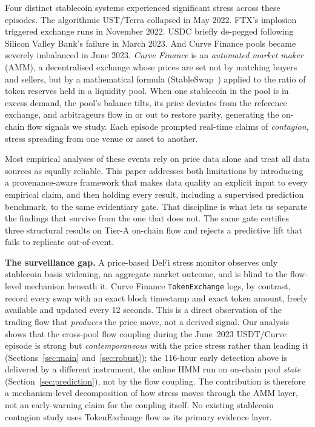 \documentclass[sigconf,anonymous]{acmart}
\begin{document}
Four distinct stablecoin systems experienced significant stress across these
episodes. The algorithmic UST/Terra collapsed in May 2022. FTX's implosion
triggered exchange runs in November 2022. USDC briefly de-pegged following
Silicon Valley Bank's failure in March 2023. And Curve Finance pools became
severely imbalanced in June 2023.  \emph{Curve Finance} is an \emph{automated
market maker} (AMM), a decentralised exchange whose prices are set not by
matching buyers and sellers, but by a mathematical formula (StableSwap~\cite{Egorov2019})
applied to the ratio of token reserves held in a liquidity pool.  When one
stablecoin in the pool is in excess demand, the pool's balance tilts, its
price deviates from the reference exchange, and arbitrageurs flow in or out
to restore parity, generating the on-chain flow signals we study.
Each episode prompted real-time claims of
\emph{contagion}, stress spreading from one venue or asset to another.

Most empirical analyses of these events rely on price data alone and treat all
data sources as equally reliable.  This paper addresses both limitations by
introducing a provenance-aware framework that makes data quality an explicit
input to every empirical claim, and then holding every result, including a
supervised prediction benchmark, to the same evidentiary gate.  That discipline
is what lets us separate the findings that survive from the one that does not.
The same gate certifies three structural results on Tier-A on-chain flow and
rejects a predictive lift that fails to replicate out-of-event.

\textbf{The surveillance gap.}
A price-based DeFi stress monitor observes only stablecoin basis widening, an
aggregate market outcome, and is blind to the flow-level mechanism beneath it.
Curve Finance \texttt{TokenExchange} logs, by contrast, record every swap with
an exact block timestamp and exact token amount, freely available and updated
every 12 seconds.  This is a direct observation of the trading flow that
\emph{produces} the price move, not a derived signal.  Our analysis shows that
the cross-pool flow coupling during the June~2023 USDT/Curve episode is
strong but \emph{contemporaneous} with the price stress rather than leading it
(Sections~\ref{sec:main} and~\ref{sec:robust}); the 116-hour early detection above
is delivered by a different instrument, the online HMM run on on-chain pool
\emph{state} (Section~\ref{sec:prediction}), not by the flow coupling. The
contribution is therefore a mechanism-level decomposition of how stress moves
through the AMM layer, not an early-warning claim for the coupling itself.  No existing stablecoin contagion study uses TokenExchange
flow as its primary evidence layer.
\end{document}
